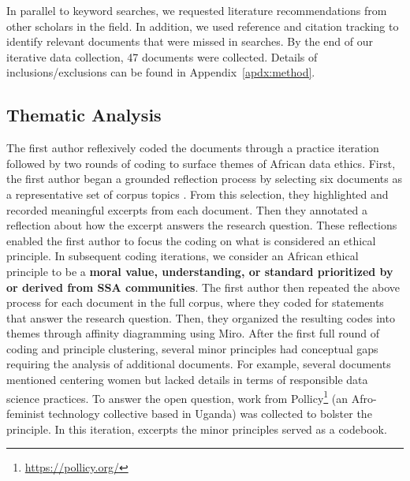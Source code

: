 In parallel to keyword searches, we requested literature recommendations from other scholars in the field. 
 In addition, we used reference and citation tracking to identify relevant documents that were missed in searches. By the end of our iterative data collection, 47 documents were collected. Details of inclusions/exclusions can be found in Appendix~\ref{apdx:method}.


\subsection{Thematic Analysis}
 The first author reflexively coded the documents through a practice iteration followed by two rounds of coding to surface themes of African data ethics. 
     First, the first author began a grounded reflection process by selecting six documents as a representative set of corpus topics \cite{coetzee2004particularity, mhlambi2020from, african_union2024continental, ndjungu2020blood, segun2021critically, day2023data}.
     From this selection, they highlighted and recorded meaningful excerpts from each document. Then they annotated a reflection about how the excerpt answers the research question. These reflections enabled the first author to focus the coding on what is considered an ethical principle. In subsequent coding iterations, we consider an African ethical principle to be a \textbf{moral value, understanding, or standard prioritized by or derived from SSA communities}. 
     The first author then repeated the above process for each document in the full corpus, where they coded for statements that answer the research question. Then, they organized the resulting codes into themes through affinity diagramming \cite{scupin2008kj} using Miro.
     After the first full round of coding and principle clustering, several minor principles had conceptual gaps 
     requiring the analysis of additional documents. For example, several documents mentioned centering women but
     lacked details in terms of responsible data science practices. To answer the open question, work from Pollicy\footnote{\url{https://pollicy.org/}} (an Afro-feminist technology collective based in Uganda) was collected to bolster the principle. In this iteration, excerpts the minor principles served as a codebook.

